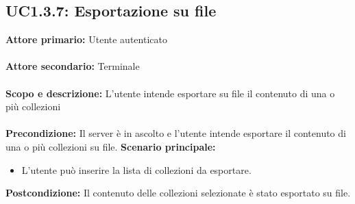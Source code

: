 \documentclass{scalatekids-article}
\begin{document}
\subsection{UC1.3.7: Esportazione su file}

\textbf{Attore primario:} Utente autenticato\\ \\
\textbf{Attore secondario:} Terminale\\ \\
\textbf{Scopo e descrizione:} L'utente intende esportare su file il contenuto di una o più collezioni\\ \\
\textbf{Precondizione:} Il server è in ascolto e l'utente intende esportare il contenuto di una o più collezioni su file.
\textbf{Scenario principale:}
\begin{itemize}
  \item L'utente può inserire la lista di collezioni da esportare. %
\end{itemize}
\textbf{Postcondizione:} Il contenuto delle collezioni selezionate è stato esportato su file.
\end{document}

